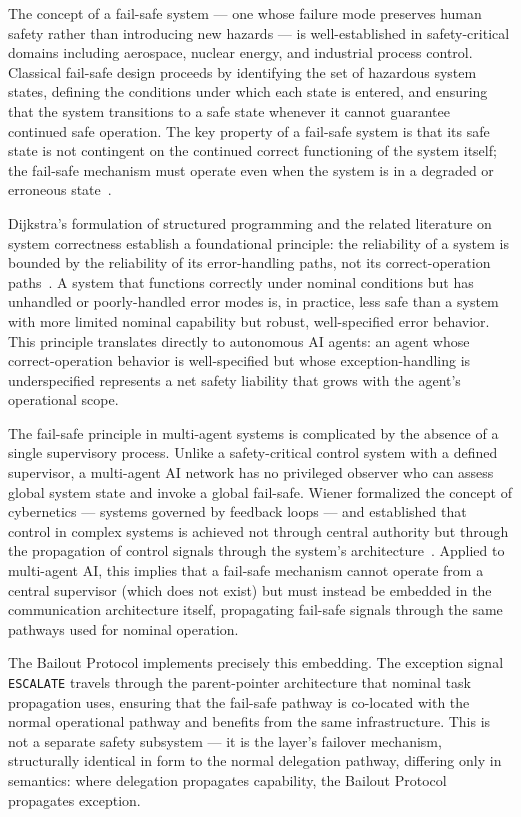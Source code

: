 The concept of a fail-safe system — one whose failure mode preserves human safety rather than introducing new hazards — is well-established in safety-critical domains including aerospace, nuclear energy, and industrial process control. Classical fail-safe design proceeds by identifying the set of hazardous system states, defining the conditions under which each state is entered, and ensuring that the system transitions to a safe state whenever it cannot guarantee continued safe operation. The key property of a fail-safe system is that its safe state is not contingent on the continued correct functioning of the system itself; the fail-safe mechanism must operate even when the system is in a degraded or erroneous state~\cite{dijkstra1982,wiener1948}.

Dijkstra's formulation of structured programming and the related literature on system correctness establish a foundational principle: the reliability of a system is bounded by the reliability of its error-handling paths, not its correct-operation paths~\cite{dijkstra1982}. A system that functions correctly under nominal conditions but has unhandled or poorly-handled error modes is, in practice, less safe than a system with more limited nominal capability but robust, well-specified error behavior. This principle translates directly to autonomous AI agents: an agent whose correct-operation behavior is well-specified but whose exception-handling is underspecified represents a net safety liability that grows with the agent's operational scope.

The fail-safe principle in multi-agent systems is complicated by the absence of a single supervisory process. Unlike a safety-critical control system with a defined supervisor, a multi-agent AI network has no privileged observer who can assess global system state and invoke a global fail-safe. Wiener formalized the concept of cybernetics — systems governed by feedback loops — and established that control in complex systems is achieved not through central authority but through the propagation of control signals through the system's architecture~\cite{wiener1948}. Applied to multi-agent AI, this implies that a fail-safe mechanism cannot operate from a central supervisor (which does not exist) but must instead be embedded in the communication architecture itself, propagating fail-safe signals through the same pathways used for nominal operation.

The Bailout Protocol implements precisely this embedding. The exception signal \texttt{ESCALATE} travels through the parent-pointer architecture that nominal task propagation uses, ensuring that the fail-safe pathway is co-located with the normal operational pathway and benefits from the same infrastructure. This is not a separate safety subsystem — it is the \bounds{} layer's failover mechanism, structurally identical in form to the normal delegation pathway, differing only in semantics: where delegation propagates capability, the Bailout Protocol propagates exception.

